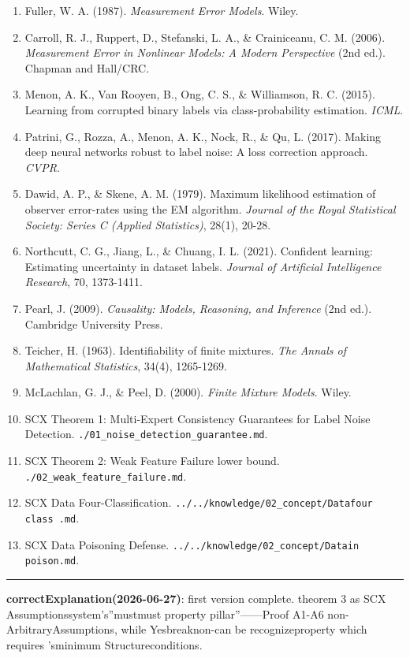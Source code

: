 \documentclass[
  12pt,
]{article}
\begin{document}
\begin{enumerate}
\def\labelenumi{\arabic{enumi}.}
\item
  Fuller, W. A. (1987). \emph{Measurement Error Models}. Wiley.
\item
  Carroll, R. J., Ruppert, D., Stefanski, L. A., \& Crainiceanu, C. M.
  (2006). \emph{Measurement Error in Nonlinear Models: A Modern
  Perspective} (2nd ed.). Chapman and Hall/CRC.
\item
  Menon, A. K., Van Rooyen, B., Ong, C. S., \& Williamson, R. C. (2015).
  Learning from corrupted binary labels via class-probability
  estimation. \emph{ICML}.
\item
  Patrini, G., Rozza, A., Menon, A. K., Nock, R., \& Qu, L. (2017).
  Making deep neural networks robust to label noise: A loss correction
  approach. \emph{CVPR}.
\item
  Dawid, A. P., \& Skene, A. M. (1979). Maximum likelihood estimation of
  observer error-rates using the EM algorithm. \emph{Journal of the
  Royal Statistical Society: Series C (Applied Statistics)}, 28(1),
  20-28.
\item
  Northcutt, C. G., Jiang, L., \& Chuang, I. L. (2021). Confident
  learning: Estimating uncertainty in dataset labels. \emph{Journal of
  Artificial Intelligence Research}, 70, 1373-1411.
\item
  Pearl, J. (2009). \emph{Causality: Models, Reasoning, and Inference}
  (2nd ed.). Cambridge University Press.
\item
  Teicher, H. (1963). Identifiability of finite mixtures. \emph{The
  Annals of Mathematical Statistics}, 34(4), 1265-1269.
\item
  McLachlan, G. J., \& Peel, D. (2000). \emph{Finite Mixture Models}.
  Wiley.
\item
  SCX Theorem 1: Multi-Expert Consistency Guarantees for Label Noise
  Detection. \texttt{./01\_noise\_detection\_guarantee.md}.
\item
  SCX Theorem 2: Weak Feature Failure lower bound.
  \texttt{./02\_weak\_feature\_failure.md}.
\item
  SCX Data Four-Classification.
  \texttt{../../knowledge/02\_concept/Datafour class .md}.
\item
  SCX Data Poisoning Defense.
  \texttt{../../knowledge/02\_concept/Datain poison.md}.
\end{enumerate}

\begin{center}\rule{0.5\linewidth}{0.5pt}\end{center}

\textbf{correctExplanation(2026-06-27)}: first version complete. theorem  3 as  SCX
Assumptionssystem's''mustmust property pillar''------Proof A1-A6
non-ArbitraryAssumptions, while Yesbreaknon-can be recognizeproperty which requires 'sminimum Structureconditions. 
\end{document}

